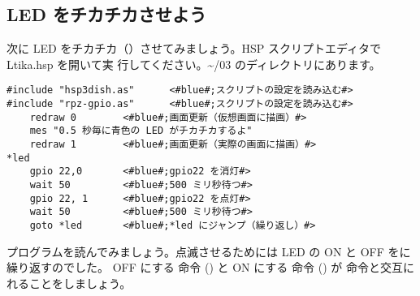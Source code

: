 \subsection{LED をチカチカさせよう}

次に LED をチカチカ（）させてみましょう。HSP スクリプトエディタで Ltika.hsp を開いて実
行してください。\textasciitilde /03 のディレクトリにあります。\\

\begin{lstlisting}[caption=Ltika.hsp,label=Ltika.hsp]
#include "hsp3dish.as"		<#blue#;スクリプトの設定を読み込む#>
#include "rpz-gpio.as"		<#blue#;スクリプトの設定を読み込む#>
	redraw 0		<#blue#;画面更新（仮想画面に描画）#>
	mes "0.5 秒毎に青色の LED がチカチカするよ"
	redraw 1		<#blue#;画面更新（実際の画面に描画）#>
*led
	gpio 22,0		<#blue#;gpio22 を消灯#>
	wait 50 		<#blue#;500 ミリ秒待つ#>
	gpio 22, 1 		<#blue#;gpio22 を点灯#>
	wait 50 		<#blue#;500 ミリ秒待つ#>
	goto *led 		<#blue#;*led にジャンプ（繰り返し）#>
\end{lstlisting}

プログラムを読んでみましょう。点滅させるためには LED の ON と OFF をに繰り返すのでした。
OFF にする  命令 () と ON にする  命令 () が  命令と交互に
れることをしましょう。\\

\begin{tcolorbox}[title=\useOmetoi]
\begin{enumerate}
\end{enumerate}
\end{tcolorbox}
